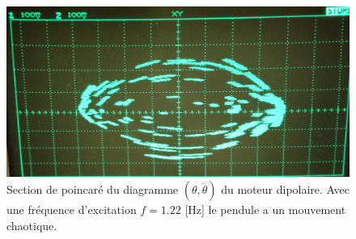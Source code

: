 \documentclass[a4paper,12pt,oneside]{article}
\begin{document}
\begin{figure}[h!]
  \begin{center}
  \includegraphics[width=1.0\linewidth,angle=0]{./figures/chao_1_22Hz_v2.png}
  \caption{Section de poincaré du diagramme $(\theta,\dot{\theta})$ du moteur dipolaire. Avec une fréquence d'excitation $f=1.22$ [Hz] le pendule a un mouvement chaotique.} \label{fig:chaos}
  \end{center}
\end{figure}
\end{document}
